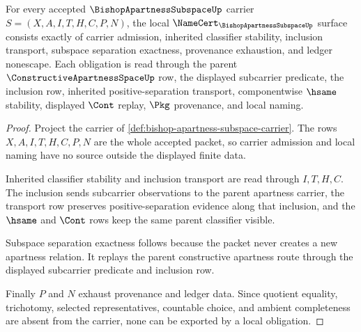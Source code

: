 \begin{theorem}
\label{thm:bishop-apartness-subspace-namecert-obligations}
For every accepted $\BishopApartnessSubspaceUp$ carrier $S=(X,A,I,T,H,C,P,N)$, the local $\NameCert_{\BishopApartnessSubspaceUp}$ surface consists exactly of carrier admission, inherited classifier stability, inclusion transport, subspace separation exactness, provenance exhaustion, and ledger nonescape. Each obligation is read through the parent $\ConstructiveApartnessSpaceUp$ row, the displayed subcarrier predicate, the inclusion row, inherited positive-separation transport, componentwise $\hsame$ stability, displayed $\Cont$ replay, $\Pkg$ provenance, and local naming.
\end{theorem}
\begin{proof}
Project the carrier of \autoref{def:bishop-apartness-subspace-carrier}. The rows $X,A,I,T,H,C,P,N$ are the whole accepted packet, so carrier admission and local naming have no source outside the displayed finite data.

Inherited classifier stability and inclusion transport are read through $I,T,H,C$. The inclusion sends subcarrier observations to the parent apartness carrier, the transport row preserves positive-separation evidence along that inclusion, and the $\hsame$ and $\Cont$ rows keep the same parent classifier visible.

Subspace separation exactness follows because the packet never creates a new apartness relation. It replays the parent constructive apartness route through the displayed subcarrier predicate and inclusion row.

Finally $P$ and $N$ exhaust provenance and ledger data. Since quotient equality, trichotomy, selected representatives, countable choice, and ambient completeness are absent from the carrier, none can be exported by a local obligation.
\end{proof}

